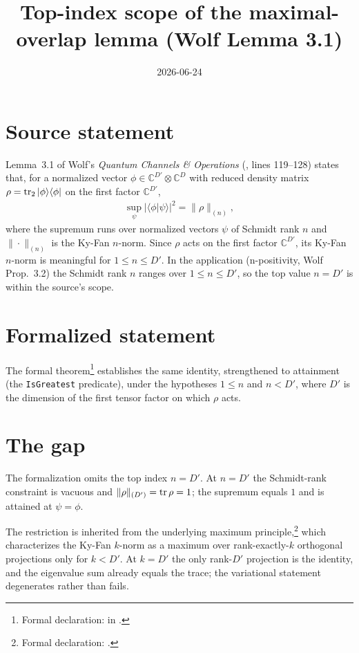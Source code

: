 \documentclass{article}
\title{Top-index scope of the maximal-overlap lemma (Wolf Lemma 3.1)}
\author{}
\date{2026-06-24}
\begin{document}
\maketitle
{}

\section{Source statement}

Lemma~3.1 of Wolf's \emph{Quantum Channels \& Operations}
(, lines
119--128) states that, for a normalized vector
$\phi\in\mathbb{C}^{D'}\otimes\mathbb{C}^{D}$ with reduced density matrix
$\rho=\operatorname{tr}_2|\phi\rangle\langle\phi|$ on the first factor $\mathbb{C}^{D'}$,
\begin{align}
  \sup_{\psi}|\langle\phi|\psi\rangle|^2 = \|\rho\|_{(n)},
\end{align}
where the supremum runs over normalized vectors $\psi$ of Schmidt rank $n$ and
$\|\cdot\|_{(n)}$ is the Ky-Fan $n$-norm. Since $\rho$ acts on the first factor
$\mathbb{C}^{D'}$, its Ky-Fan $n$-norm is meaningful for $1\le n\le D'$. In the
application (n-positivity, Wolf Prop.~3.2) the Schmidt rank $n$ ranges over
$1\le n\le D'$, so the top value $n=D'$ is within the source's scope.

\section{Formalized statement}

The formal theorem\footnote{Formal declaration:
     in
    .} establishes the same identity,
strengthened to attainment (the \Lean{} \texttt{IsGreatest} predicate), under
the hypotheses $1\le n$ and $n<D'$, where $D'$ is the dimension of the first
tensor factor on which $\rho$ acts.

\section{The gap}

The formalization omits the top index $n=D'$. At $n=D'$ the Schmidt-rank
constraint is vacuous and $\|\rho\|_{(D')}=\operatorname{tr}\rho=1$; the supremum equals $1$
and is attained at $\psi=\phi$.

The restriction is inherited from the underlying maximum principle,\footnote{Formal
    declaration: .} which
characterizes the Ky-Fan $k$-norm as a maximum over rank-exactly-$k$ orthogonal
projections only for $k<D'$. At $k=D'$ the only rank-$D'$ projection is the
identity, and the eigenvalue sum already equals the trace; the variational
statement degenerates rather than fails.
\end{document}
